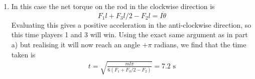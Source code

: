 \begin{problem}
{\begin{enumerate}
\begin{align*}
\end{align*}
Since $F_2>F_1$,  player 2 will win and we want the time it takes to reach $\theta=-\pi$ radians, so the final answer becomes
\begin{equation*}
t=\sqrt{\frac{-ml\pi}{6(F_1-F_2)}}=5.1\textrm{ s}
\end{equation*}
\item In this case the net torque on the rod in the clockwise direction is 
\begin{equation*}
F_1l+F_3l/2-F_2l=I\ddot\theta
\end{equation*}
Evaluating this gives a positive acceleration in the anti-clockwise direction, so this time players 1 and 3 will win. Using the exact same argument as in part a) but realising it will now reach an angle $+\pi$ radians, we find that the time taken is 
\begin{align*}
t=\sqrt{\frac{ml\pi}{6(F_1+F_3/2-F_2)}}=7.2\textrm{ s}
\end{align*}
\end{enumerate}
}
\end{problem}